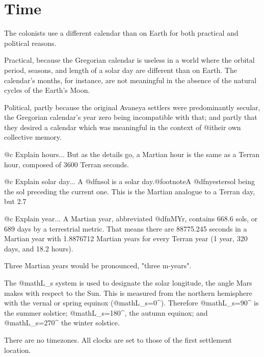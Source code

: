 \section{Time}

The colonists use a different calendar than on Earth for both practical and political reasons.

Practical, because the Gregorian calendar is useless in a world where the orbital period, seasons, and length of a solar day are different than on Earth. The calendar's months, for instance, are not meaningful in the absence of the natural cycles of the Earth's Moon.

Political, partly because the original Avaneya settlers were predominantly secular, the Gregorian calendar's year zero being incompatible with that; and partly that they desired a calendar which was meaningful in the context of @i{their own} collective memory.

@c Explain hours...
But as the details go, a Martian hour is the same as a Terran hour, composed of 3600 Terran seconds.

@c Explain solar day...
A @dfn{sol} is a solar day.@footnote{A @dfn{yestersol} being the sol preceding the current one.} This is the Martian analogue to a Terran day, but 2.7 %

@c Explain year...
A Martian year, abbreviated @dfn{MYr}, contains 668.6 sols, or 689 days by a terrestrial metric. That means there are 88775.245 seconds in a Martian year with 1.8876712 Martian years for every Terran year (1 year, 320 days, and 18.2 hours). 

Three Martian years would be pronounced, "three m-years".

The @math{L_s} system is used to designate the solar longitude, the angle Mars makes with respect to the Sun. This is measured from the northern hemisphere with the vernal or spring equinox (@math{L_s=0^{\circ}}). Therefore @math{L_s=90^{\circ}} is the summer solstice; @math{L_s=180^{\circ}}, the autumn equinox; and @math{L_s=270^{\circ}} the winter solstice. 

There are no timezones. All clocks are set to those of the first settlement location.


